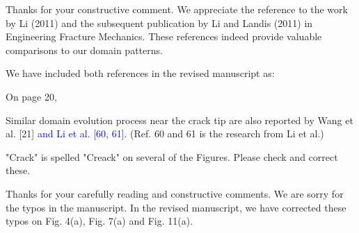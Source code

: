 \documentclass[12pt,fleqn]{article}
\begin{document}
\begin{response}
Thanks for your constructive comment. We appreciate the reference to the work by Li (2011) and the subsequent publication by Li and Landis (2011) in Engineering Fracture Mechanics. These references indeed provide valuable comparisons to our domain patterns.

We have included both references in the revised manuscript as:

On page 20, 
\begin{revised}
Similar domain evolution process near the crack tip are also reported by Wang et al. [21] \textcolor{blue}{and Li et al. [60, 61]}.  (Ref. 60 and 61 is the research from Li et al.)
\end{revised}
\end{response}

\begin{question}{}\label{R1:Q7}
    "Crack" is spelled "Creack" on several of the Figures. Please check and correct these.
\end{question}
\begin{response}
Thanks for your carefully reading and constructive comments. We are sorry for the typos in the manuscript. In the revised manuscript, we have corrected these typos on Fig. 4(a), Fig. 7(a) and Fig. 11(a).
\end{response}
\end{document}
